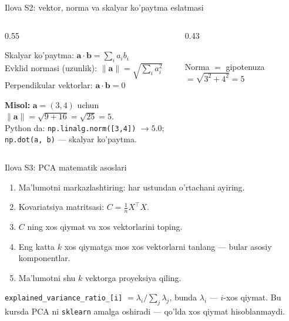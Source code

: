 \documentclass[aspectratio=169,11pt]{beamer}
\newcommand{\gcap}[1]{{\scriptsize\color{halfgray}#1}}
\begin{document}
\begin{frame}{Ilova S2: vektor, norma va skalyar ko'paytma eslatmasi}
  \begin{columns}[T]
    \begin{column}{0.55\textwidth}
      \begin{tcolorbox}[defbox,title=Kerakli tushunchalar,top=2pt,bottom=2pt]
        \small
        Skalyar ko'paytma: $\mathbf{a}\cdot\mathbf{b}=\sum_i a_i b_i$\\[3pt]
        Evklid normasi (uzunlik): $\lVert\mathbf{a}\rVert=\sqrt{\sum_i a_i^2}$\\[3pt]
        Perpendikular vektorlar: $\mathbf{a}\cdot\mathbf{b}=0$
      \end{tcolorbox}
      \vspace{4pt}
      \small\textbf{Misol:} $\mathbf{a}=(3,4)$ uchun
      $\lVert\mathbf{a}\rVert=\sqrt{9+16}=\sqrt{25}=5$.\\[5pt]
      Python da: \texttt{np.linalg.norm([3,4])} $\to 5.0$;\\[2pt]
      \texttt{np.dot(a, b)} --- skalyar ko'paytma.
    \end{column}
    \begin{column}{0.43\textwidth}
      \centering
      \\[2pt]
      \gcap{Norma $=$ gipotenuza $=\sqrt{3^2+4^2}=5$}
    \end{column}
  \end{columns}
\end{frame}

\begin{frame}{Ilova S3: PCA matematik asoslari}
  \begin{enumerate}\small\setlength\itemsep{5pt}
    \item Ma'lumotni markazlashtiring: har ustundan o'rtachani ayiring.
    \item Kovariatsiya matritsasi: $C=\frac{1}{n}X^\top X$.
    \item $C$ ning xos qiymat va xos vektorlarini toping.
    \item Eng katta $k$ xos qiymatga mos xos vektorlarni tanlang ---
          bular asosiy komponentlar.
    \item Ma'lumotni shu $k$ vektorga proyeksiya qiling.
  \end{enumerate}
  \vspace{4pt}
  \footnotesize\color{halfgray}
  \texttt{explained\_variance\_ratio\_[i]} $=\lambda_i / \sum_j \lambda_j$,
  bunda $\lambda_i$ --- $i$-xos qiymat. Bu kursda PCA ni \texttt{sklearn}
  amalga oshiradi --- qo'lda xos qiymat hisoblanmaydi.
\end{frame}
\end{document}
